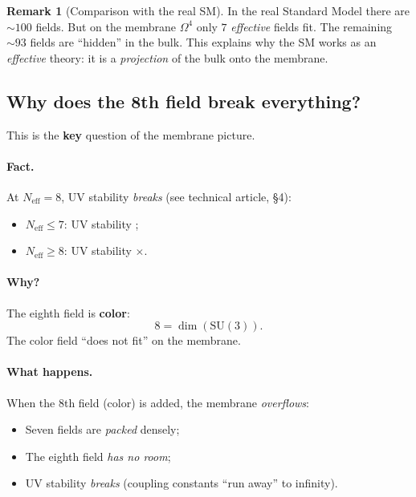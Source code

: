 \documentclass[11pt,a4paper]{article}
\newcommand{\SU}{\mathrm{SU}}
\newcommand{\Om}{\Omega^4}
\newcommand{\Neff}{N_{\text{eff}}}
\theoremstyle{definition}
\newtheorem{remark}[theorem]{Remark}
\begin{document}
\begin{remark}[Comparison with the real SM]
\label{rem:vs-sm}
In the real Standard Model there are $\sim 100$ fields. But on the membrane 
$\Om$ only \textbf{$7$} \emph{effective} fields fit. The remaining 
$\sim 93$ fields are ``hidden'' in the bulk. This explains 
why the SM works as an \emph{effective} theory: it is a 
\emph{projection} of the bulk onto the membrane.
\end{remark}

\subsection{Why does the 8th field break everything?}
\label{subsec:eighth-field}

This is the \textbf{key} question of the membrane picture.

\paragraph{Fact.}
At $\Neff = 8$, UV stability \emph{breaks} 
(see technical article, §4):
\begin{itemize}
    \item $\Neff \le 7$: UV stability \checkmark;
    \item $\Neff \ge 8$: UV stability $\times$.
\end{itemize}

\paragraph{Why?}
The eighth field is \textbf{color}:
\begin{equation}
    8 = \dim(\SU(3)).
\end{equation}
The color field ``does not fit'' on the membrane.

\paragraph{What happens.}
When the 8th field (color) is added, the membrane \emph{overflows}:
\begin{itemize}
    \item Seven fields are \emph{packed} densely;
    \item The eighth field \emph{has no room};
    \item UV stability \emph{breaks} (coupling constants 
          ``run away'' to infinity).
\end{itemize}
\end{document}
